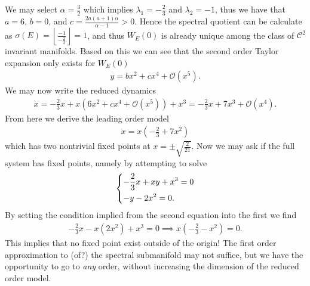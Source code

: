 \begin{ex}[]
We may select $\alpha =\frac{3}{2}$ which implies $\lambda_1 = -\frac{2}{3}$ and $\lambda _2 = -1$, thus we have that $a=6$, $b=0$, and $c= \frac{2a(a+1)\alpha }{\alpha -1}>0$. Hence the spectral quotient can be calculate as $\sigma(E) = \left\lfloor \frac{-1}{-\frac{2}{3}}\right\rfloor = 1$, and thus $W_E(0)$ is already unique among the class of $\mathcal{C}^{2}$ invariant manifolds. Based on this we can see that the second order Taylor expansion only exists for $W_E(0)$ 
\begin{align}
	y = bx^2 + cx^4 + \mathcal{O}(x^5).
\end{align}
We may now write the reduced dynamics
\begin{align}
	\dot{x} = - \frac{2}{3} x + x(6x^2+cx^4 + \mathcal{O}(x^5)) + x^3 = -\frac{2}{3}x + 7x^3 + \mathcal{O}(x^4).
\end{align}
From here we derive the leading order model
\begin{align}
	\dot{x} = x\left( -\frac{2}{3} + 7x^2\right)
\end{align}
which has two nontrivial fixed points at $x = \pm \sqrt{\frac{2}{21}}$. Now we may ask if the full system has fixed points, namely by attempting to solve
\begin{align}
	\begin{dcases}
		-\frac{2}{3} x + xy + x^3 = 0\\
		-y - 2x^2 = 0.
	\end{dcases}
\end{align}
By setting the condition implied from the second equation into the first we find
\begin{align}
	-\frac{2}{3}x - x(2x^2) + x^3 = 0 \implies x\left(-\frac{2}{3} - x^2 \right) =0. 
\end{align}
This implies that no fixed point exist outside of the origin! The first order approximation to {\color{blue}(of?)} the spectral submanifold may not suffice, but we have the opportunity to go to \emph{any} order, without increasing the dimension of the reduced order model.
\end{ex}

